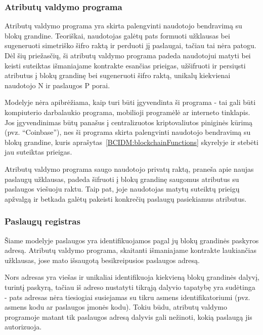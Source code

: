\subsubsection{Atributų valdymo programa}

Atributų valdymo programa yra skirta palengvinti naudotojo bendravimą su blokų grandine. Teoriškai, naudotojas galėtų pats formuoti užklausas
bei sugeneruoti simetriško šifro raktą ir perduoti jį paslaugai, tačiau tai nėra patogu. Dėl šių priežasčių, ši atributų valdymo
programa padeda naudotojui matyti bei keisti suteiktas išmaniajame kontrakte esančias prieigas, užšifruoti ir persiųsti atributus į blokų grandinę
bei sugeneruoti šifro raktą, unikalų kiekvienai naudotojo N ir paslaugos P porai.

Modelyje nėra apibrėžiama, kaip turi būti įgyvendinta ši programa - tai gali būti kompiuterio darbalaukio programa,
mobilioji programėlė ar 
interneto tinklapis. Jos įgyvendinimas būtų panašus į centralizuotos kriptovaliutos piniginės kūrimą (pvz. \enquote{Coinbase}), nes ši
programa skirta palengvinti naudotojo bendravimą su blokų grandine, kuris aprašytas\hypertarget{BCIDM:blockchainFunctions}{~\ref{BCIDM:blockchainFunctions}} skyrelyje ir
stebėti jau suteiktas prieigas.

Atributų valdymo programa saugo naudotojo privatų raktą, praneša apie naujas paslaugų užklausas, padeda šifruoti
į blokų grandinę saugomus atributus su paslaugos viešuoju raktu. Taip pat, joje naudotojas
matytų suteiktų prieigų apžvalgą ir betkada galėtų pakeisti konkrečių paslaugų pasiekiamus atributus.

\subsubsection{Paslaugų registras} \label{BCIDM:serviceRegister}

Šiame modelyje paslaugos yra identifikuojamos pagal jų blokų grandinės paskyros adresą. Atributų valdymo programa,
skaitanti išmaniajame kontrakte laukiančias užklausas, jose mato išsaugotą besikreipusios paslaugos adresą.

Nors adresas yra viešas ir unikaliai identifikuoja kiekvieną blokų grandinės dalyvį, turintį paskyrą, tačiau iš adreso nustatyti tikrąją dalyvio tapatybę yra sudėtinga -
pats adresas nėra tiesiogiai susiejamas su tikru asmens identifikatoriumi (pvz. asmens kodu ar paslaugos įmonės kodu).
Tokiu būdu, atributų valdymo programoje matant tik paslaugos adresą dalyvis gali nežinoti, kokią paslaugą jis autorizuoja.

